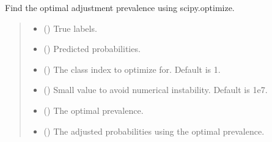 \documentclass[letterpaper,10pt,english]{sphinxmanual}
\begin{document}
\begin{fulllineitems}
\label{\detokenize{calzone:calzone.utils.find_optimal_prevalence}}
\pysigstartsignatures
{}
\pysigstopsignatures
\sphinxAtStartPar
Find the optimal adjustment prevalence using scipy.optimize.
\begin{quote}\begin{description}
\begin{itemize}
\item {} 
\sphinxAtStartPar
{} () \textendash{} True labels.

\item {} 
\sphinxAtStartPar
{} () \textendash{} Predicted probabilities.

\item {} 
\sphinxAtStartPar
{} () \textendash{} The class index to optimize for. Default is 1.

\item {} 
\sphinxAtStartPar
{} () \textendash{} Small value to avoid numerical instability. Default is 1e\sphinxhyphen{}7.

\end{itemize}

\begin{itemize}
\item {} 
\sphinxAtStartPar
{} () \textendash{} The optimal prevalence.

\item {} 
\sphinxAtStartPar
{} () \textendash{} The adjusted probabilities using the optimal prevalence.

\end{itemize}

\end{description}\end{quote}

\end{fulllineitems}
\end{document}
